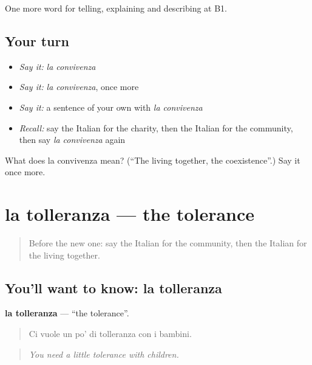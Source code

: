 \begin{grammarlens}[title={What you've built}]
One more word for telling, explaining and describing at B1.
\end{grammarlens}

\subsection*{Your turn}
\begin{itemize}
\raggedright
  \item \emph{Say it:} \emph{la convivenza}
  \item \emph{Say it:} \emph{la convivenza}, once more
  \item \emph{Say it:} a sentence of your own with \emph{la convivenza}
  \item \emph{Recall:} say the Italian for the charity, then the Italian for the community, then say \emph{la convivenza} again
\end{itemize}

\begin{tcolorbox}[breakable,colback=teal!4,colframe=teal!35!black,title={Before you move on}]
What does la convivenza mean? (\textquotedblleft{}The living together, the coexistence\textquotedblright{}.) Say it once more.
\end{tcolorbox}
\section[la tolleranza]{la tolleranza — the tolerance}

\label{lesson:IT-C368-tolleranza}



\begin{quote}
Before the new one: say the Italian for the community, then the Italian for the living together.
\end{quote}

\subsection*{You'll want to know: la tolleranza}
\textbf{la tolleranza} — \textquotedblleft{}the tolerance\textquotedblright{}.

\begin{quote}
Ci vuole un po' di tolleranza con i bambini.
\end{quote}

\begin{quote}
\emph{You need a little tolerance with children.}
\end{quote}

